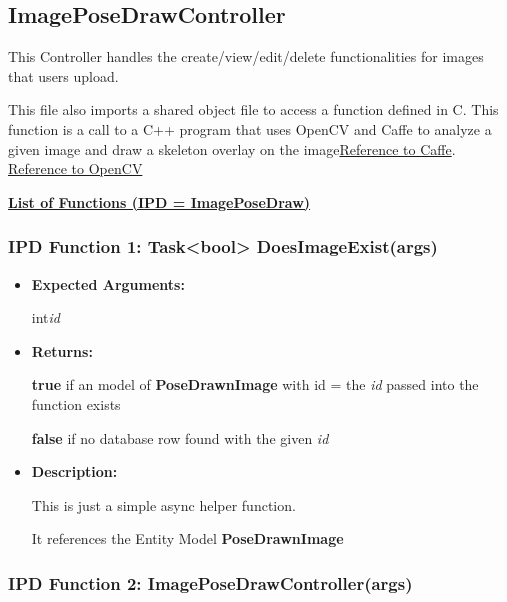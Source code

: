 \documentclass{scrreprt}
\begin{document}
\subsection{ImagePoseDrawController}

This Controller handles the create/view/edit/delete functionalities for images
that users upload.

This file also imports a shared object file to access a function defined in C.
This function is a call to a C++ program that uses OpenCV and Caffe to analyze
a given image and draw a skeleton overlay on the image\href{http://caffe.berkeleyvision.org/doxygen/index.html}{Reference to Caffe}.
\href{http://docs.opencv.org/3.1.0/}{Reference to OpenCV}

\underline{ \textbf{List of Functions (IPD = ImagePoseDraw)}}

\subsubsection{IPD Function 1: Task\textless bool\textgreater
               DoesImageExist(args)}

\begin{itemize}
        \item \textbf{Expected Arguments:}

                int\quad\textit{id}

        \item \textbf{Returns:}

                \textbf{true} if an model of \textbf{PoseDrawnImage} with id =
                the \textit{id} passed into the function exists

                \textbf{false} if no database row found with the given
                \textit{id}

        \item \textbf{Description:}

                This is just a simple async helper function.

                It references the Entity Model \textbf{PoseDrawnImage}
\end{itemize}

\subsubsection{IPD Function 2: ImagePoseDrawController(args)}
\end{document}
